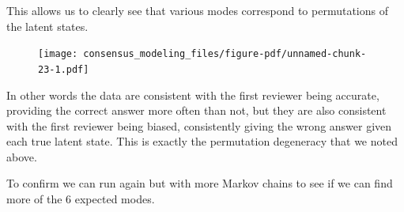 \documentclass[
  letterpaper,
  DIV=11,
  numbers=noendperiod]{scrartcl}
\newenvironment{Shaded}{\begin{snugshade}}{\end{snugshade}}
\newcommand{\AttributeTok}[1]{\textcolor[rgb]{0.40,0.45,0.13}{#1}}
\newcommand{\ControlFlowTok}[1]{\textcolor[rgb]{0.00,0.23,0.31}{#1}}
\newcommand{\DecValTok}[1]{\textcolor[rgb]{0.68,0.00,0.00}{#1}}
\newcommand{\FunctionTok}[1]{\textcolor[rgb]{0.28,0.35,0.67}{#1}}
\newcommand{\NormalTok}[1]{\textcolor[rgb]{0.00,0.23,0.31}{#1}}
\newcommand{\OtherTok}[1]{\textcolor[rgb]{0.00,0.23,0.31}{#1}}
\newcommand{\SpecialCharTok}[1]{\textcolor[rgb]{0.37,0.37,0.37}{#1}}
\newcommand{\StringTok}[1]{\textcolor[rgb]{0.13,0.47,0.30}{#1}}
\begin{document}
This allows us to clearly see that various modes correspond to
permutations of the latent states.

\begin{Shaded}
\end{Shaded}

\begin{figure}[H]

{\centering \texttt{[image: consensus\_modeling\_files/figure-pdf/unnamed-chunk-23-1.pdf]}

}

\end{figure}

In other words the data are consistent with the first reviewer being
accurate, providing the correct answer more often than not, but they are
also consistent with the first reviewer being biased, consistently
giving the wrong answer given each true latent state. This is exactly
the permutation degeneracy that we noted above.

To confirm we can run again but with more Markov chains to see if we can
find more of the \(6\) expected modes.

\begin{Shaded}
\end{Shaded}
\end{document}
